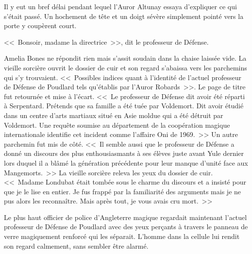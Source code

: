 Il y eut un bref délai pendant lequel l'Auror Altunay essaya d'expliquer ce qui s'était passé. Un hochement de tête et un doigt sévère simplement pointé vers la porte y coupèrent court.

<<~Bonsoir, madame la directrice~>>, dit le professeur de Défense.

Amelia Bones ne répondit rien mais s'assit soudain dans la chaise laissée vide. La vieille sorcière ouvrit le dossier de cuir et son regard s'abaissa vers les parchemins qui s'y trouvaient. <<~Possibles indices quant à l'identité de l'actuel professeur de Défense de Poudlard tels qu'établis par l'Auror Robards~>>. Le page de titre fut retournée et mise à l'écart. <<~Le professeur de Défense dit avoir été réparti à Serpentard. Prétends que sa famille a été tuée par Voldemort. Dit avoir étudié dans un centre d'arts martiaux situé en Asie moldue qui a été détruit par Voldemort. Une requête soumise au département de la coopération magique internationale identifie cet incident comme l'affaire Oni de 1969.~>> Un autre parchemin fut mis de côté. <<~Il semble aussi que le professeur de Défense a donné un discours des plus enthousiasmants à ses élèves juste avant Yule dernier lors duquel il a blâmé la génération précédente pour leur manque d'unité face aux Mangemorts.~>> La vieille sorcière releva les yeux du dossier de cuir. <<~Madame Londubat était tombée sous le charme du discours et a insisté pour que je le lise en entier. Je fus frappé par la familiarité des arguments mais je ne pus alors les reconnaître. Mais après tout, je vous avais cru mort.~>>

Le plus haut officier de police d'Angleterre magique regardait maintenant l'actuel professeur de Défense de Poudlard avec des yeux perçants à travers le panneau de verre magiquement renforcé qui les séparait. L'homme dans la cellule lui rendit son regard calmement, sans sembler être alarmé.


